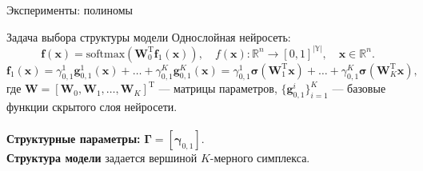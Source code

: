 \documentclass[usenames,dvipsnames,10pt,pdf,utf8,russian,aspectratio=43]{beamer}
\begin{document}
\begin{frame}{Эксперименты: полиномы}
\begin{figure}
  \centering
\label{fig:1}\qquad

\end{figure}
\end{frame}


\begin{frame}{Задача выбора структуры модели}
\small
Однослойная нейросеть:
\[
    \mathbf{f}(\mathbf{x}) = \text{softmax}\left(\mathbf{W}_0^\text{T}\mathbf{f}_1(\mathbf{x})\right), \quad f(\mathbf{x}): \mathbb{R}^n \to [0,1]^{|\mathbb{Y}|}, \quad \mathbf{x} \in \mathbb{R}^n.
\]
\[
\]
\[
\mathbf{f}_1(\mathbf{x}) = {\gamma}_{0,1}^{1}\mathbf{g}_{0,1}^{1}(\mathbf{x})+\dots+{\gamma}_{0,1}^{K}\mathbf{g}_{0,1}^{K}(\mathbf{x})= {\gamma}_{0,1}^{1}\boldsymbol{\sigma}(\mathbf{W}_1^\text{T}\mathbf{x}) + \dots +  {\gamma}_{0,1}^{K}\boldsymbol{\sigma}(\mathbf{W}_K^\text{T}\mathbf{x}),
\]
где $\mathbf{W} = [\mathbf{W}_0,\mathbf{W}_1, \dots, \mathbf{W}_K]^\text{T}$ --- матрицы параметров, $\{\mathbf{g}^{i}_{0,1}\}_{i=1}^K$ --- базовые функции скрытого слоя нейросети.~\\~\\

\textbf{Структурные параметры:}  $\boldsymbol{\Gamma} = [\boldsymbol{\gamma}_{0,1}]$.\\
\textbf{Структура модели} задается вершиной $K$-мерного симплекса.
    
\end{frame}
\end{document}
